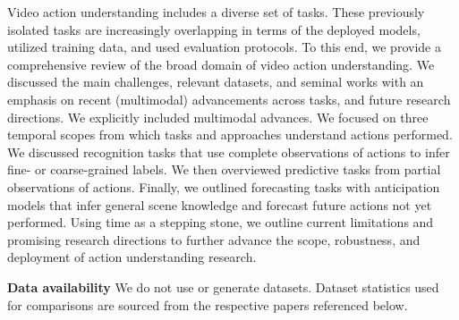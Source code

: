 Video action understanding includes a diverse set of tasks. These previously isolated tasks are increasingly overlapping in terms of the deployed models, utilized training data, and used evaluation protocols. To this end, we provide a comprehensive review of the broad domain of video action understanding. We discussed the main challenges, relevant datasets, and seminal works with an emphasis on recent (multimodal) advancements across tasks, and future research directions. We explicitly included multimodal advances. We focused on three temporal scopes from which tasks and approaches understand actions performed. We discussed recognition tasks that use complete observations of actions to infer fine- or coarse-grained labels. We then overviewed predictive tasks from partial observations of actions. Finally, we outlined forecasting tasks with anticipation models that infer general scene knowledge and forecast future actions not yet performed. Using time as a stepping stone, we outline current limitations and promising research directions to further advance the scope, robustness, and deployment of action understanding research.


\noindent
\textbf{Data availability}
We do not use or generate datasets. Dataset statistics used for comparisons are sourced from the respective papers referenced below. 